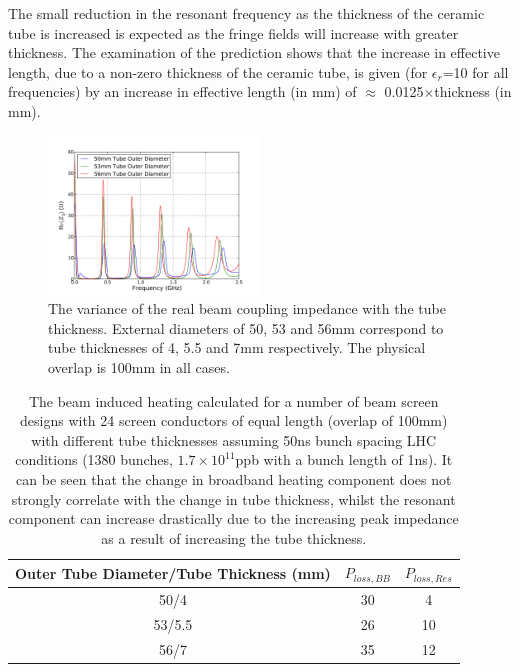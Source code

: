 The small reduction in the resonant frequency as the thickness of the ceramic tube is increased is expected as the fringe fields will increase with greater thickness. The examination of the prediction shows that the increase in effective length, due to a non-zero thickness of the ceramic tube, is given (for $\epsilon_{r}$=10 for all frequencies) by an increase in effective length (in mm) of $\approx$ 0.0125$\times$thickness (in mm).

\begin{figure}
\begin{center}
\includegraphics[width=0.5\textwidth]{LHC_MKI/figures/mki-tube-thickness-real.pdf}
\end{center}
\caption{The variance of the real beam coupling impedance with the tube thickness. External diameters of 50, 53 and 56mm correspond to tube thicknesses of 4, 5.5 and 7mm respectively. The physical overlap is 100mm in all cases.}
\label{fig:tube-thickness-imp}
\end{figure}

\begin{table}
\caption{The beam induced heating calculated for a number of beam screen designs with 24 screen conductors of equal length (overlap of 100mm) with different tube thicknesses assuming 50ns bunch spacing LHC conditions (1380 bunches, $1.7\times 10^{11}$ppb with a bunch length of 1ns). It can be seen that the change in broadband heating component does not strongly correlate with the change in tube thickness, whilst the resonant component can increase drastically due to the increasing peak impedance as a result of increasing the tube thickness.}
\label{tab:thickness-heating}
\begin{center}
\begin{tabular}{c | c | c }
Outer Tube Diameter/Tube Thickness (mm)  & $P_{loss, BB}$ & $P_{loss, Res}$ \\ \hline
50/4  & 30 & 4 \\ \hline
53/5.5  & 26 & 10 \\ \hline
56/7  & 35 & 12 \\ 
\end{tabular}
\end{center}
\end{table}

